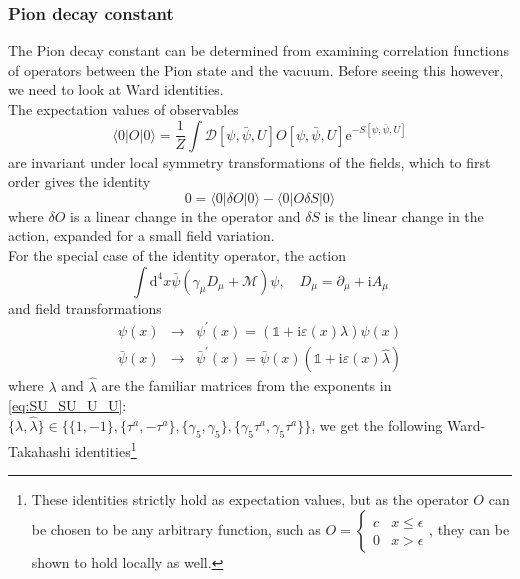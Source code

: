 \documentclass[a4paper,10pt]{article}
\begin{document}
\subsubsection{Pion decay constant}
The Pion decay constant can be determined from examining correlation functions of operators between the Pion state and the vacuum. Before seeing this however, we need to look at Ward identities.\\ The expectation values of observables 
\begin{equation}
\langle 0|O| 0\rangle=\frac{1}{Z} \int \mathcal{D}[\psi, \bar{\psi}, U] O[\psi, \bar{\psi}, U] \mathrm{e}^{-S[\psi, \bar{\psi}, U]}
\end{equation}
are invariant under local symmetry transformations of the fields, which to first order gives the identity
\begin{equation}
0=\langle 0|\delta O| 0\rangle-\langle 0|O \delta S| 0\rangle
\end{equation}
where $\delta O$ is a linear change in the operator and $\delta S$ is the linear change in the action, expanded for a small field variation.\\For the special case of the identity operator, the action
\begin{equation}
\int \mathrm{d}^{4} x \bar{\psi}\left(\gamma_{\mu} D_{\mu}+\mathcal{M}\right) \psi, \quad D_{\mu}=\partial_{\mu}+\mathrm{i} A_{\mu}
\end{equation}
and field transformations
\begin{equation}
\begin{array}{rlr}
\psi(x) & \rightarrow & \psi^{\prime}(x)=(\mathbb{1}+\mathrm{i} \varepsilon(x) \lambda) \psi(x) \\
\bar{\psi}(x) & \rightarrow & \bar{\psi}^{\prime}(x)=\bar{\psi}(x)(\mathbb{1}+\mathrm{i} \varepsilon(x) \hat{\lambda})
\end{array}
\end{equation}
where $\lambda$ and $\hat{\lambda}$ are the familiar matrices from the exponents in \eqref{eq:SU_SU_U_U}:\\ $\{\lambda,\hat{\lambda}\} \in \{\{1,-1 \} ,\{\tau^a,-\tau^a \}, \{\gamma_5,\gamma_5 \},\{\gamma_5\tau^a,\gamma_5\tau^a \} \}$, we get the following Ward-Takahashi identities\footnote{These identities strictly hold as expectation values, but as the operator $O$ can be chosen to be any arbitrary function, such as $O = \begin{cases} 
      c & x\leq \epsilon \\
      0 & x > \epsilon
   \end{cases}$, they can be shown to hold locally as well.}
\end{document}
